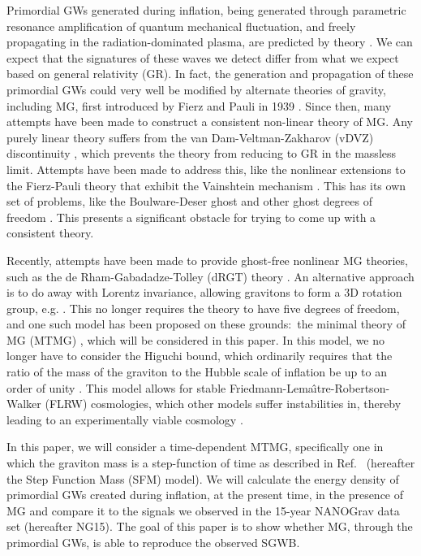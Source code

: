 \documentclass[prd,twocolumn,aps,psfig,nofootinbib,nobibnotes,superscriptaddress,preprintnumbers,times]{revtex4-2}
\begin{document}
Primordial GWs generated during inflation, being generated through parametric resonance amplification of quantum mechanical fluctuation, and freely propagating in the radiation-dominated plasma, are predicted by theory 
\cite{Grishchuk:1976,Grishchuk:1977zz,Starobinsky:1980te,Linde:1981mu,Fabbri:1983us}. We can expect that the signatures of these waves we detect differ from what we expect based on general relativity (GR). In fact, the generation and propagation of these primordial GWs could very well be modified by alternate theories of gravity, including MG, first introduced by Fierz and Pauli in 1939 \cite{Fierz:1939ix}. Since then, many attempts have been made to construct a consistent non-linear theory of MG. Any purely linear theory suffers from the van Dam-Veltman-Zakharov (vDVZ) discontinuity \cite{vanDam:1970vg,Zakharov:1970cc}, which prevents the theory from reducing to GR in the massless limit. Attempts have been made to address this, like the nonlinear extensions to the Fierz-Pauli theory that exhibit the Vainshtein mechanism \cite{Vainshtein:1972sx}. This has its own set of problems, like the Boulware-Deser ghost and other ghost degrees of freedom \cite{Boulware:1972yco,Dubovsky:2004sg}. This presents a significant obstacle for trying to come up with a consistent theory.

Recently, attempts have been made to provide ghost-free nonlinear MG  theories, such as the de Rham-Gabadadze-Tolley (dRGT) theory \cite{Hassan:2011tf, Hassan:2011ea, deRham:2010ik,deRham:2010kj}. An alternative approach is to do away with Lorentz invariance, allowing gravitons to form a 3D rotation group, e.g. \cite{Arkani-Hamed:2003pdi, Rubakov:2004eb, Dubovsky:2004sg, Blas:2009my, Rubakov:2008nh, Blas:2007zz, Comelli:2013txa, Langlois:2014jba}. This no longer requires the theory to have five degrees of freedom, and one such model has been proposed on these grounds:\ the minimal theory of MG (MTMG) \cite{DeFelice:2015hla, DeFelice:2015moy}, which will be considered in this paper. In this model, we no longer have to consider the Higuchi bound, which ordinarily requires that the ratio of the mass of the graviton to the Hubble scale of inflation be up to an order of unity \cite{Higuchi:1986py}. This model allows for stable Friedmann-Lema\^{\i}tre-Robertson-Walker (FLRW) cosmologies, which other models suffer instabilities in, thereby leading to an experimentally viable cosmology \cite{DeFelice:2015hla}.

In this paper, we will consider a time-dependent MTMG, specifically one in which the graviton mass is a step-function of time as described in Ref.\ \cite{Fujita:2018ehq} (hereafter the Step Function Mass (SFM) model). We will calculate the energy density of primordial GWs created during inflation, at the present time, in the presence of MG and compare it to the signals we observed in the 15-year NANOGrav data set (hereafter NG15). The goal of this paper is to show whether MG, through the primordial GWs, is able to reproduce the observed SGWB.
\end{document}
